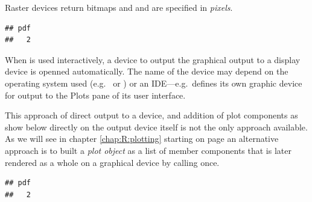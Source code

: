 \documentclass[krantz2]{krantz}\usepackage{knitr}%
\begin{document}
Raster devices return bitmaps and  and  are specified in \emph{pixels}.

\begin{knitrout}\footnotesize
{}\color{fgcolor}\begin{kframe}
\begin{alltt}
\hlstd{(} \hlstd{=} \hlstd{,}  \hlstd{=} \hlstd{,}  \hlstd{=} \hlstd{)}
 \hlopt{~}   
\hlstd{()}
\end{alltt}
\begin{verbatim}
## pdf 
##   2
\end{verbatim}
\end{kframe}
\end{knitrout}

When \Rlang is used interactively, a device to output the graphical output to a display device is openned automatically. The name of the device may depend on the operating system used (e.g.\  or ) or an IDE---e.g.\ \RStudio defines its own graphic device for output to the Plots pane of its user interface.

\begin{warningbox}
This approach of direct output to a device, and addition of plot components as show below directly on the output device itself is not the only approach available. As we will see in chapter \ref{chap:R:plotting} starting on page \pageref{chap:R:plotting} an alternative approach is to built a \emph{plot object} as a list of member components that is later rendered as a whole on a graphical device by calling  once.

\begin{knitrout}\footnotesize
{}\color{fgcolor}\begin{kframe}
\begin{alltt}
\hlstd{(} \hlstd{=} \hlstd{,}  \hlstd{=} \hlstd{,}  \hlstd{=} \hlstd{)}
 \hlopt{~}   
\hlstd{(} \hlstd{=} \hlstd{,}  \hlstd{=} \hlstd{,}  \hlstd{=} \hlstd{)}
\hlstd{()}
\end{alltt}
\begin{verbatim}
## pdf 
##   2
\end{verbatim}
\end{kframe}
\end{knitrout}
\end{warningbox}
\end{document}
